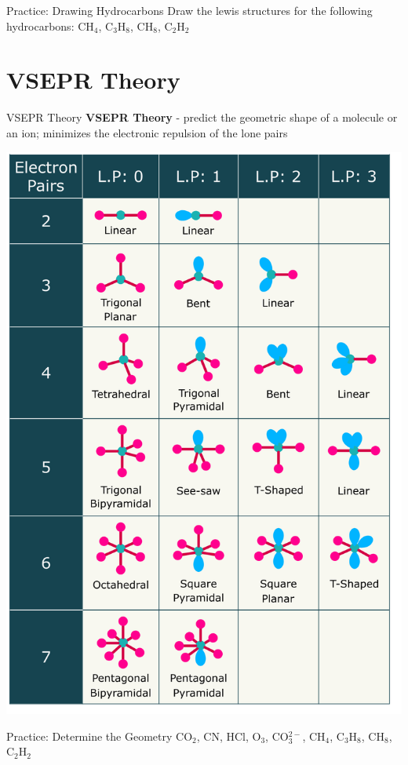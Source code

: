 \documentclass[11pt]{beamer}
\begin{document}
\begin{frame}{Practice: Drawing Hydrocarbons}
  Draw the lewis structures for the following hydrocarbons:
  CH$_4$, C$_3$H$_8$, CH$_8$, C$_2$H$_2$
  \vspace{1.75in}
\end{frame}

\section{VSEPR Theory}

\begin{frame}{VSEPR Theory}
  \textbf{VSEPR Theory} - predict the geometric shape of a
  molecule or an ion; minimizes the electronic repulsion of
  the lone pairs
\end{frame}

\begin{frame}
  \vspace{0.15in}
  \centering
  \includegraphics[width=0.6\linewidth]{vsepr_diag}
\end{frame}

\begin{frame}{Practice: Determine the Geometry}
  CO$_2$, CN, HCl, O$_3$, CO$_3^{2-}$,
  CH$_4$, C$_3$H$_8$, CH$_8$, C$_2$H$_2$
  \vspace{1.75in}
\end{frame}
\end{document}

